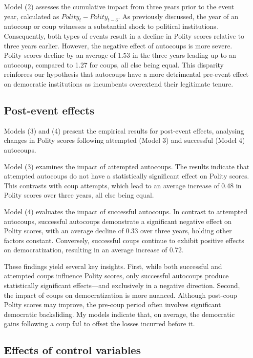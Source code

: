 \documentclass[
  12pt,
]{report}
\begin{document}
Model (2) assesses the cumulative impact from three years prior to the
event year, calculated as \(Polity_{t} - Polity_{t-3}\). As previously
discussed, the year of an autocoup or coup witnesses a substantial shock
to political institutions. Consequently, both types of events result in
a decline in Polity scores relative to three years earlier. However, the
negative effect of autocoups is more severe. Polity scores decline by an
average of 1.53 in the three years leading up to an autocoup, compared
to 1.27 for coups, all else being equal. This disparity reinforces our
hypothesis that autocoups have a more detrimental pre-event effect on
democratic institutions as incumbents overextend their legitimate
tenure.

\subsection{Post-event effects}\label{post-event-effects}

Models (3) and (4) present the empirical results for post-event effects,
analysing changes in Polity scores following attempted (Model 3) and
successful (Model 4) autocoups.

Model (3) examines the impact of attempted autocoups. The results
indicate that attempted autocoups do not have a statistically
significant effect on Polity scores. This contrasts with coup attempts,
which lead to an average increase of 0.48 in Polity scores over three
years, all else being equal.

Model (4) evaluates the impact of successful autocoups. In contrast to
attempted autocoups, successful autocoups demonstrate a significant
negative effect on Polity scores, with an average decline of 0.33 over
three years, holding other factors constant. Conversely, successful
coups continue to exhibit positive effects on democratization, resulting
in an average increase of 0.72.

These findings yield several key insights. First, while both successful
and attempted coups influence Polity scores, only successful autocoups
produce statistically significant effects---and exclusively in a
negative direction. Second, the impact of coups on democratization is
more nuanced. Although post-coup Polity scores may improve, the pre-coup
period often involves significant democratic backsliding. My models
indicate that, on average, the democratic gains following a coup fail to
offset the losses incurred before it.

\subsection{Effects of control
variables}\label{effects-of-control-variables}
\end{document}
